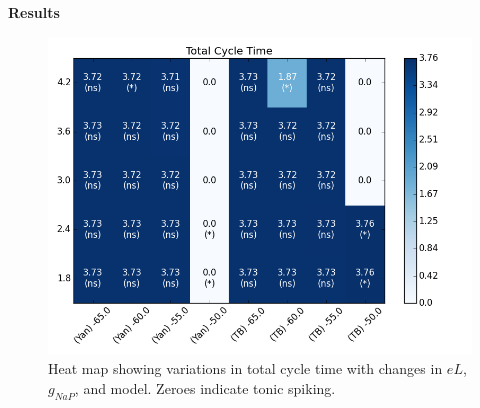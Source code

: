 \documentclass[11pt]{article}
\begin{document}
\oddsidemargin -0.22in
\evensidemargin -0.22in
\topmargin 0.05in
\topskip 0.25in
\headheight 0.05in
\headsep 0.25in





\begin{center}
\Large{\textbf{Results}}
\end{center}


\begin{figure}
	\centering
	\includegraphics[scale=0.4]{heatmap_Total_Cycle_Time.png}
	\caption{Heat map showing variations in total cycle time with changes in $eL$, $g_{NaP}$, and model. Zeroes indicate tonic spiking.}
	\label{fig:hm_tct}
\end{figure}
\end{document}
